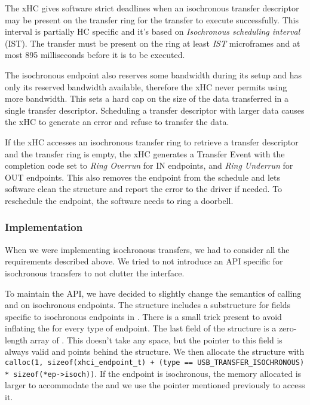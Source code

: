 The xHC gives software strict deadlines when an isochronous transfer descriptor
may be present on the transfer ring for the transfer to execute successfully.
This interval is partially HC specific and it's based on \textit{Isochronous
scheduling interval} (IST). The transfer must be present on the ring at least
\textit{IST} microframes and at most 895 milliseconds before it is to be
executed.

The isochronous endpoint also reserves some bandwidth during its setup and has
only its reserved bandwidth available, therefore the xHC never permits using
more bandwidth. This sets a hard cap on the size of the data transferred in a
single transfer descriptor. Scheduling a transfer descriptor with larger data
causes the xHC to generate an error and refuse to transfer the data.

If the xHC accesses an isochronous transfer ring to retrieve a transfer
descriptor and the transfer ring is empty, the xHC generates a Transfer Event
with the completion code set to \textit{Ring Overrun} for IN endpoints, and
\textit{Ring Underrun} for OUT endpoints. This also removes the endpoint from
the schedule and lets software clean the structure and report the error to the
driver if needed. To reschedule the endpoint, the software needs to ring a
doorbell.

\subsubsection{Implementation}

When we were implementing isochronous transfers, we had to consider all the
requirements described above. We tried to not introduce an API specific for
isochronous transfers to not clutter the interface.

To maintain the  API, we have decided to slightly change the
semantics of calling  and  on isochronous
endpoints. The  structure includes a substructure for
fields specific to isochronous endpoints in . There is a
small trick present to avoid inflating the  for every
type of endpoint. The last field of the structure is a zero-length array of
. This doesn't take any space, but the pointer to this
field is always valid and points behind the structure. We then allocate the
structure with \texttt{calloc(1, sizeof(xhci\_endpoint\_t) + (type ==
USB\_TRANSFER\_ISOCHRONOUS) * sizeof(*ep->isoch))}. If the endpoint is
isochronous, the memory allocated is larger to accommodate the
 and we use the pointer mentioned previously to access it.

